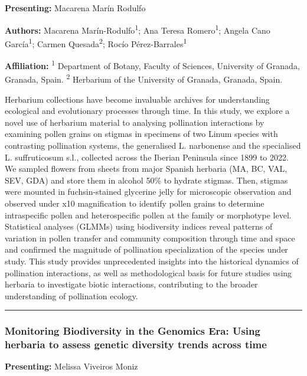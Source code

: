\documentclass[
  letterpaper,
  DIV=11,
  numbers=noendperiod]{scrartcl}
\begin{document}
\textbf{Presenting:} Macarena Marín Rodulfo

\textbf{Authors:} Macarena Marín-Rodulfo\textsuperscript{1}; Ana Teresa
Romero\textsuperscript{1}; Angela Cano García\textsuperscript{1}; Carmen
Quesada\textsuperscript{2}; Rocío Pérez-Barrales\textsuperscript{1}

\textbf{Affiliation:} \textsuperscript{1} Department of Botany, Faculty
of Sciences, University of Granada, Granada, Spain. \textsuperscript{2}
Herbarium of the University of Granada, Granada, Spain.

Herbarium collections have become invaluable archives for understanding
ecological and evolutionary processes through time. In this study, we
explore a novel use of herbarium material to analysing pollination
interactions by examining pollen grains on stigmas in specimens of two
Linum species with contrasting pollination systems, the generalised L.
narbonense and the specialised L. suffruticosum s.l., collected across
the Iberian Peninsula since 1899 to 2022. We sampled flowers from sheets
from major Spanish herbaria (MA, BC, VAL, SEV, GDA) and store them in
alcohol 50\% to hydrate stigmas. Then, stigmas were mounted in
fuchsin-stained glycerine jelly for microscopic observation and observed
under x10 magnification to identify pollen grains to determine
intraspecific pollen and heterospecific pollen at the family or
morphotype level. Statistical analyses (GLMMs) using biodiversity
indices reveal patterns of variation in pollen transfer and community
composition through time and space and confirmed the magnitude of
pollination specialization of the species under study. This study
provides unprecedented insights into the historical dynamics of
pollination interactions, as well as methodological basis for future
studies using herbaria to investigate biotic interactions, contributing
to the broader understanding of pollination ecology.

\begin{center}\rule{0.5\linewidth}{0.5pt}\end{center}

\subsubsection{Monitoring Biodiversity in the Genomics Era: Using
herbaria to assess genetic diversity trends across
time}\label{monitoring-biodiversity-in-the-genomics-era-using-herbaria-to-assess-genetic-diversity-trends-across-time}

\textbf{Presenting:} Melissa Viveiros Moniz
\end{document}
